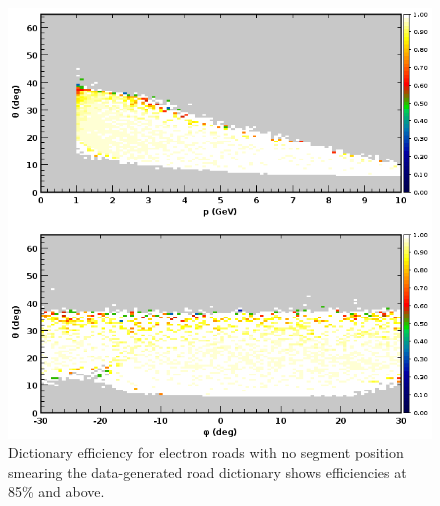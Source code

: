\begin{figure}[hbt]
	\centering
	\includegraphics[width=1.0\columnwidth,keepaspectratio]{img/dc_neg_data_efficiency_nosmearing.png}
	\caption{Dictionary efficiency for electron roads with no segment position smearing the data-generated
          road dictionary shows efficiencies at 85\% and above.}
	\label{fig:dc_neg_data_efficiency_nosmearing}
\end{figure}


